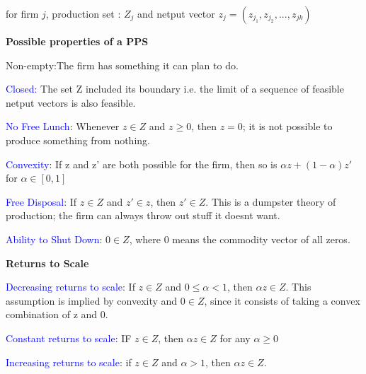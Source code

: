 \documentclass{tufte-handout}
\begin{document}
\textbullet   for firm $j$, production set :  $Z_j$ and netput vector  $z_j = (z_{j_1},z_{j_2},...,z_{jk})$

\vspace{1cm}


\textbf{Possible properties of a PPS}

\textbullet   Non-empty:The firm has something it can plan to do.

\textbullet   \textcolor{blue}{Closed:} The set Z included its boundary i.e. the limit of a sequence of feasible netput vectors is also feasible.

\textbullet   \textcolor{blue}{No Free Lunch}: Whenever
$z \in Z$ and  $z \geq 0$, then  $z = 0$; it is not possible to produce something from nothing.

\textbullet  \textcolor{blue}{Convexity}: If z and z' are both possible for the firm, then so is $\alpha z + (1-\alpha)z'$ for  $\alpha \in [0,1]$


 \textbullet  \textcolor{blue}{Free Disposal}: If $z \in Z$ and  $z' \in z$, then  $z' \in  Z$. This is a dumpster theory of production; the firm can always throw out stuff it doesnt want.

\textbullet   \textcolor{blue}{Ability to Shut Down}: $0 \in Z$, where  $0$ means the commodity vector of all zeros.

\vspace{1cm}


\textbf{Returns to Scale}

\textbullet  \textcolor{blue}{Decreasing returns to scale}: If $z \in Z$ and  $0 \leq \alpha < 1$, then  $\alpha z \in Z$. This assumption is implied by convexity and $0 \in Z$, since it consists of taking a convex combination of z and 0. 

 \textbullet  \textcolor{blue}{Constant returns to scale}: IF $z \in Z$, then  $\alpha z \in Z$ for any  $\alpha \geq 0$

\textbullet   \textcolor{blue}{Increasing returns to scale}: if $z \in Z$ and  $\alpha > 1$, then  $\alpha z \in Z$.
\end{document}
